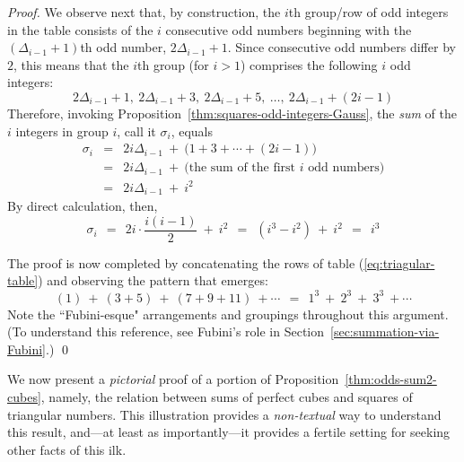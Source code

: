 \begin{proof}
We observe next that, by construction, the $i$th group/row of odd integers in the table consists of the
$i$ consecutive odd numbers beginning with the $\left( \Delta_{i-1} +1 \right)$th odd number,
$2 \Delta_{i-1} +1$.  Since consecutive odd numbers differ by $2$, this means that the $i$th
group (for $i>1$) comprises the following $i$ odd integers:
\[
2 \Delta_{i-1} +1, \ 2 \Delta_{i-1}  +3, \ 2 \Delta_{i-1}  +5 , \
\ldots, \ 2 \Delta_{i-1} + (2i-1)
\]
Therefore, invoking Proposition~\ref{thm:squares-odd-integers-Gauss},
the {\em sum} of the $i$ integers in group $i$, call it $\sigma_i$, equals
\begin{eqnarray*}
\sigma_i & = &
2 i \Delta_{i-1} \ + \ \big( 1 + 3 + \cdots + (2i-1) \big) \\
   & = & 2 i \Delta_{i-1} \ + \ \mbox{(the sum of the first $i$ odd numbers)} \\
   & = & 2 i \Delta_{i-1} \ + \ i^2
\end{eqnarray*}
By direct calculation, then, 
\[ \sigma_i \ \ = \ \
2i  \cdot \frac{i(i-1)}{2} \ + \ i^2 \ \ = \ \
(i^3 - i^2)  \ + \ i^2 \ \ = \ \ i^3
\]

\noindent
The proof is now completed by concatenating the rows of table (\ref{eq:triagular-table}) and
observing the pattern that emerges:
\[ (1) \ + \ (3 + 5) \ + \ (7 + 9 + 11) \  + \cdots
\ \ = \ \ 1^3 \ + \ 2^3 \ + \ 3^3 \ + \cdots 
\]
Note the ``Fubini-esque" arrangements and groupings throughout this argument. (To
understand this reference, see Fubini's role in Section~\ref{sec:summation-via-Fubini}.)  \qed
\end{proof}


We now present a {\em pictorial} proof of a portion of Proposition~\ref{thm:odds-sum2-cubes},
namely, the relation between sums of perfect cubes  and squares of triangular numbers.
This illustration provides a {\em non-textual} way to understand this result, and---at least
as importantly---it provides a fertile setting for seeking other facts of this ilk.

